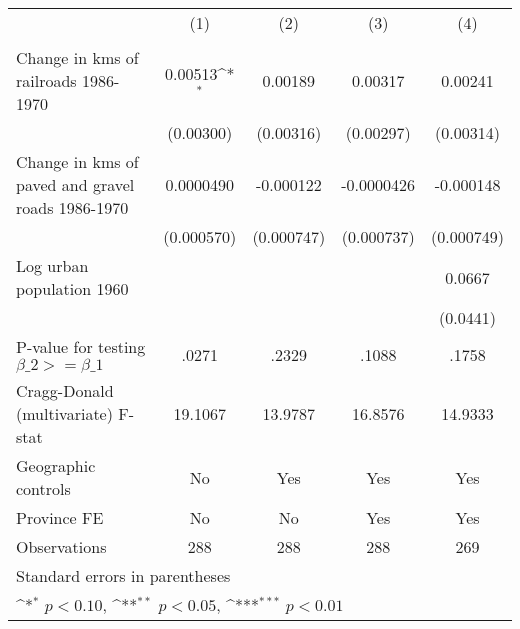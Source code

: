 {
\def\sym#1{\ifmmode^{#1}\else\(^{#1}\)\fi}
\begin{tabular}{l*{4}{c}}
\hline\hline
                &\multicolumn{1}{c}{(1)}&\multicolumn{1}{c}{(2)}&\multicolumn{1}{c}{(3)}&\multicolumn{1}{c}{(4)}\\
                &\multicolumn{1}{c}{}&\multicolumn{1}{c}{}&\multicolumn{1}{c}{}&\multicolumn{1}{c}{}\\
\hline
Change in kms of railroads 1986-1970&  0.00513\sym{*}  &  0.00189         &  0.00317         &  0.00241         \\
                &(0.00300)         &(0.00316)         &(0.00297)         &(0.00314)         \\
[1em]
Change in kms of paved and gravel roads 1986-1970&0.0000490         &-0.000122         &-0.0000426         &-0.000148         \\
                &(0.000570)         &(0.000747)         &(0.000737)         &(0.000749)         \\
[1em]
Log urban population 1960&                  &                  &                  &   0.0667         \\
                &                  &                  &                  & (0.0441)         \\
\hline
P-value for testing $\beta\_{2} >= \beta\_{1}$&    .0271         &    .2329         &    .1088         &    .1758         \\
Cragg-Donald (multivariate) F-stat&  19.1067         &  13.9787         &  16.8576         &  14.9333         \\
Geographic controls&       No         &      Yes         &      Yes         &      Yes         \\
Province FE     &       No         &       No         &      Yes         &      Yes         \\
Observations    &      288         &      288         &      288         &      269         \\
\hline\hline
\multicolumn{5}{l}{\footnotesize Standard errors in parentheses}\\
\multicolumn{5}{l}{\footnotesize \sym{*} \(p<0.10\), \sym{**} \(p<0.05\), \sym{***} \(p<0.01\)}\\
\end{tabular}
}
